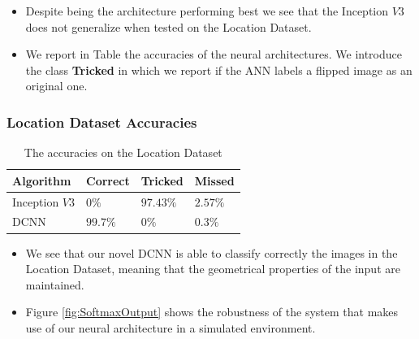 \documentclass[a0, portrait]{IWIposter}
\begin{document}
\begin{multicols}{3}
\begin{itemize}
	\item Despite being the architecture performing best we see that the Inception $V3$ does not generalize when tested on the Location Dataset.
	\item We report in Table the accuracies of the neural architectures. We introduce the class \textbf{Tricked} in which we report if the ANN labels a flipped image as an original one.
\end{itemize}

\centering
\subsubsection*{Location Dataset Accuracies}

\begin{table}
\centering
\caption{The accuracies on the Location Dataset}
\begin{tabular}{>{\rowmac}l|>{\rowmac}l|>{\rowmac}l|>{\rowmac}l<{\clearrow}}
\textbf{Algorithm}   & \textbf{Correct} & \textbf{Tricked} & \textbf{Missed}  \\ \hline
       Inception $V3$         & $0\%$              & $97.43\%$            & $2.57\%$     \\
       DCNN                   & $99.7\%$              & $0\%$           & $0.3\%$          \\
\end{tabular}\label{tab:tab2}
\end{table}

\begin{itemize}
	\item We see that our novel DCNN is able to classify correctly the images in the Location Dataset, meaning that the geometrical properties of the input are maintained. 
	\item Figure \ref{fig:SoftmaxOutput} shows the robustness of the system that makes use of our neural architecture in a simulated environment. 
\end{itemize}



\end{multicols}
\end{document}
